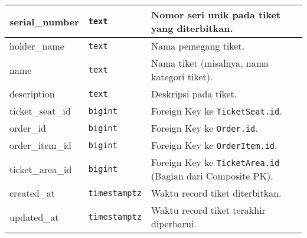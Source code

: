 \begin{longtable}{|l|p{}|p{}|}
	\hline
	serial\_number       & \texttt{text}            & Nomor seri unik pada tiket yang diterbitkan.                        \\
	\hline
	holder\_name         & \texttt{text}            & Nama pemegang tiket.                                                \\
	\hline
	name                 & \texttt{text}            & Nama tiket (misalnya, nama kategori tiket).                         \\
	\hline
	description          & \texttt{text}            & Deskripsi pada tiket.                                               \\
	\hline
	ticket\_seat\_id     & \texttt{bigint}          & Foreign Key ke \texttt{TicketSeat.id}.                              \\
	\hline
	order\_id            & \texttt{bigint}          & Foreign Key ke \texttt{Order.id}.                                   \\
	\hline
	order\_item\_id      & \texttt{bigint}          & Foreign Key ke \texttt{OrderItem.id}.                               \\
	\hline
	ticket\_area\_id     & \texttt{bigint}          & Foreign Key ke \texttt{TicketArea.id} (Bagian dari Composite PK).   \\
	\hline
	created\_at          & \texttt{timestamptz}     & Waktu record tiket diterbitkan.                                     \\
	\hline
	updated\_at          & \texttt{timestamptz}     & Waktu record tiket terakhir diperbarui.                             \\
\end{longtable}
\endgroup